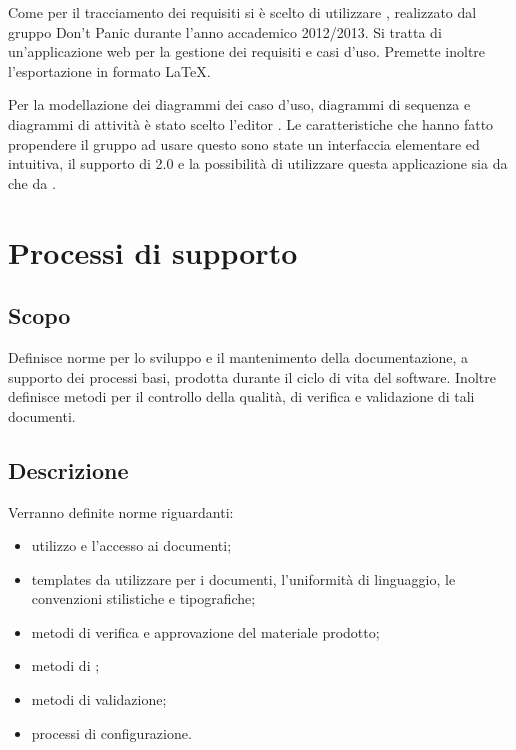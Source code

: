 \documentclass[12pt,a4paper]{article}
\begin{document}
Come  per il tracciamento dei requisiti si è scelto di utilizzare , realizzato dal gruppo Don’t Panic durante l’anno accademico 2012/2013.
Si tratta di un’applicazione web per la gestione dei requisiti e casi d’uso. Premette inoltre l’esportazione in formato \LaTeX{}.



Per la modellazione dei diagrammi dei caso d’uso, diagrammi di sequenza e diagrammi di attività è stato scelto l’editor \textit{}.		
Le caratteristiche che hanno fatto propendere il gruppo ad usare questo  sono state un interfaccia elementare ed intuitiva, il supporto di 2.0 e la possibilità di utilizzare questa applicazione sia da  che da .

\newpage

\section{Processi di supporto}

\subsection{Scopo}
Definisce norme per lo sviluppo e il mantenimento della documentazione, a supporto dei processi basi, prodotta durante il ciclo di vita del software. Inoltre definisce metodi per il controllo della qualità, di verifica e validazione di tali documenti.

\subsection{Descrizione}
Verranno definite norme riguardanti:
\begin{itemize}
	\item utilizzo e l'accesso ai documenti;
	\item templates da utilizzare per i documenti, l'uniformità di linguaggio, le convenzioni stilistiche e tipografiche;
	\item metodi di verifica e approvazione del materiale prodotto;
	\item metodi di \textit{};
	\item metodi di validazione;
	\item processi di configurazione.
\end{itemize}
\end{document}

